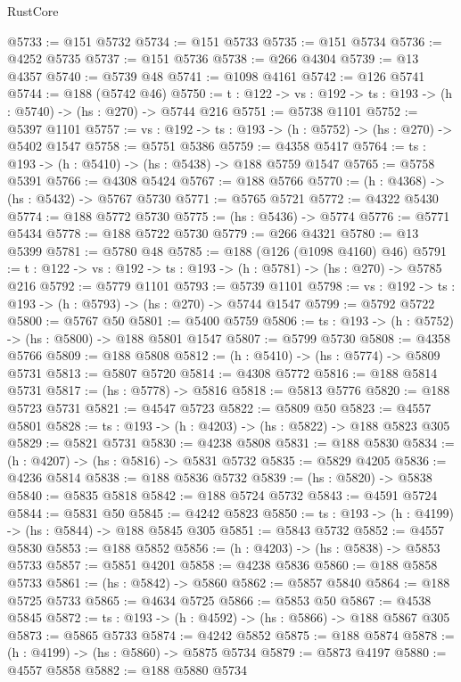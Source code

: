 \begin{lexlean}{RustCore}
\begin{coremodule}
@5733 := @151 @5732
@5734 := @151 @5733
@5735 := @151 @5734
@5736 := @4252 @5735
@5737 := @151 @5736
@5738 := @266 @4304
@5739 := @13 @4357
@5740 := @5739 @48
@5741 := @1098 @4161
@5742 := @126 @5741
@5744 := @188 (@5742 @46)
@5750 := {t : @122} -> {vs : @192} -> {ts : @193} -> (h : @5740) -> (hs : @270) -> @5744 @216
@5751 := @5738 @1101
@5752 := @5397 @1101
@5757 := {vs : @192} -> {ts : @193} -> (h : @5752) -> (hs : @270) -> @5402 @1547
@5758 := @5751 @5386
@5759 := @4358 @5417
@5764 := {ts : @193} -> (h : @5410) -> (hs : @5438) -> @188 @5759 @1547
@5765 := @5758 @5391
@5766 := @4308 @5424
@5767 := @188 @5766
@5770 := (h : @4368) -> (hs : @5432) -> @5767 @5730
@5771 := @5765 @5721
@5772 := @4322 @5430
@5774 := @188 @5772 @5730
@5775 := (hs : @5436) -> @5774
@5776 := @5771 @5434
@5778 := @188 @5722 @5730
@5779 := @266 @4321
@5780 := @13 @5399
@5781 := @5780 @48
@5785 := @188 (@126 (@1098 @4160) @46)
@5791 := {t : @122} -> {vs : @192} -> {ts : @193} -> (h : @5781) -> (hs : @270) -> @5785 @216
@5792 := @5779 @1101
@5793 := @5739 @1101
@5798 := {vs : @192} -> {ts : @193} -> (h : @5793) -> (hs : @270) -> @5744 @1547
@5799 := @5792 @5722
@5800 := @5767 @50
@5801 := @5400 @5759
@5806 := {ts : @193} -> (h : @5752) -> (hs : @5800) -> @188 @5801 @1547
@5807 := @5799 @5730
@5808 := @4358 @5766
@5809 := @188 @5808
@5812 := (h : @5410) -> (hs : @5774) -> @5809 @5731
@5813 := @5807 @5720
@5814 := @4308 @5772
@5816 := @188 @5814 @5731
@5817 := (hs : @5778) -> @5816
@5818 := @5813 @5776
@5820 := @188 @5723 @5731
@5821 := @4547 @5723
@5822 := @5809 @50
@5823 := @4557 @5801
@5828 := {ts : @193} -> (h : @4203) -> (hs : @5822) -> @188 @5823 @305
@5829 := @5821 @5731
@5830 := @4238 @5808
@5831 := @188 @5830
@5834 := (h : @4207) -> (hs : @5816) -> @5831 @5732
@5835 := @5829 @4205
@5836 := @4236 @5814
@5838 := @188 @5836 @5732
@5839 := (hs : @5820) -> @5838
@5840 := @5835 @5818
@5842 := @188 @5724 @5732
@5843 := @4591 @5724
@5844 := @5831 @50
@5845 := @4242 @5823
@5850 := {ts : @193} -> (h : @4199) -> (hs : @5844) -> @188 @5845 @305
@5851 := @5843 @5732
@5852 := @4557 @5830
@5853 := @188 @5852
@5856 := (h : @4203) -> (hs : @5838) -> @5853 @5733
@5857 := @5851 @4201
@5858 := @4238 @5836
@5860 := @188 @5858 @5733
@5861 := (hs : @5842) -> @5860
@5862 := @5857 @5840
@5864 := @188 @5725 @5733
@5865 := @4634 @5725
@5866 := @5853 @50
@5867 := @4538 @5845
@5872 := {ts : @193} -> (h : @4592) -> (hs : @5866) -> @188 @5867 @305
@5873 := @5865 @5733
@5874 := @4242 @5852
@5875 := @188 @5874
@5878 := (h : @4199) -> (hs : @5860) -> @5875 @5734
@5879 := @5873 @4197
@5880 := @4557 @5858
@5882 := @188 @5880 @5734

\end{coremodule}
\end{lexlean}
